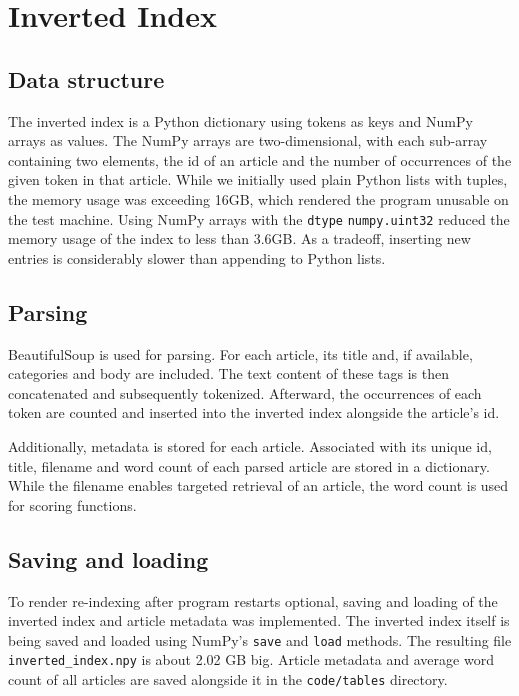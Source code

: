 \section{Inverted Index}
\label{sec:index}

\subsection{Data structure}

The inverted index is a Python dictionary using tokens as keys and NumPy arrays as values.
The NumPy arrays are two-dimensional, with each sub-array containing two elements, the id of an article and the number of occurrences of the given token in that article.
While we initially used plain Python lists with tuples, the memory usage was exceeding 16GB, which rendered the program unusable on the test machine.
Using NumPy arrays with the \verb|dtype| \verb|numpy.uint32| reduced the memory usage of the index to less than 3.6GB.
As a tradeoff, inserting new entries is considerably slower than appending to Python lists.

\subsection{Parsing}

BeautifulSoup is used for parsing.
For each article, its title and, if available, categories and body are included.
The text content of these tags is then concatenated and subsequently tokenized.
Afterward, the occurrences of each token are counted and inserted into the inverted index alongside the article's id.

Additionally, metadata is stored for each article.
Associated with its unique id, title, filename and word count of each parsed article are stored in a dictionary.
While the filename enables targeted retrieval of an article, the word count is used for scoring functions.

\subsection{Saving and loading}

To render re-indexing after program restarts optional, saving and loading of the inverted index and article metadata was implemented.
The inverted index itself is being saved and loaded using NumPy's \verb|save| and \verb|load| methods.
The resulting file \verb|inverted_index.npy| is about 2.02 GB big.
Article metadata and average word count of all articles are saved alongside it in the \verb|code/tables| directory.
